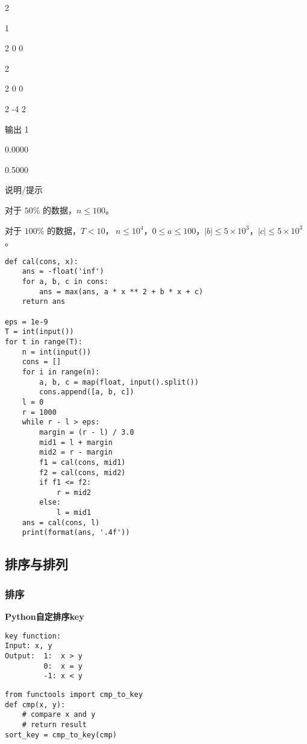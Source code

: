 \documentclass[../main]{subfiles}
\begin{document}
\begin{sloppy}
2

1

2 0 0

2

2 0 0

2 -4 2

输出 1


0.0000

0.5000


说明/提示

对于 $50\%$ 的数据，$n\le 100$。

对于 $100\%$ 的数据，$T<10$，$\ n\le 10^4$，$0\le a\le 100$，$|b| \le 5\times 10^3$，$|c| \le 5\times 10^3$。

\begin{lstlisting}[style = Python]
def cal(cons, x):
    ans = -float('inf')
    for a, b, c in cons:
        ans = max(ans, a * x ** 2 + b * x + c)
    return ans

eps = 1e-9
T = int(input())
for t in range(T):
    n = int(input())
    cons = []
    for i in range(n):
        a, b, c = map(float, input().split())
        cons.append([a, b, c])
    l = 0
    r = 1000
    while r - l > eps:
        margin = (r - l) / 3.0
        mid1 = l + margin
        mid2 = r - margin
        f1 = cal(cons, mid1)
        f2 = cal(cons, mid2)
        if f1 <= f2:
            r = mid2
        else:
            l = mid1
    ans = cal(cons, l)
    print(format(ans, '.4f'))
\end{lstlisting}

\newpage

\subsection{排序与排列}

\subsubsection{排序}

\textbf{Python自定排序key}

\begin{verbatim}
key function:
Input: x, y
Output:  1:  x > y
         0:  x = y
         -1: x < y
\end{verbatim}

\begin{lstlisting}[style = Python]
from functools import cmp_to_key
def cmp(x, y):
    # compare x and y
    # return result
sort_key = cmp_to_key(cmp)
\end{lstlisting}


\end{sloppy}
\end{document}

